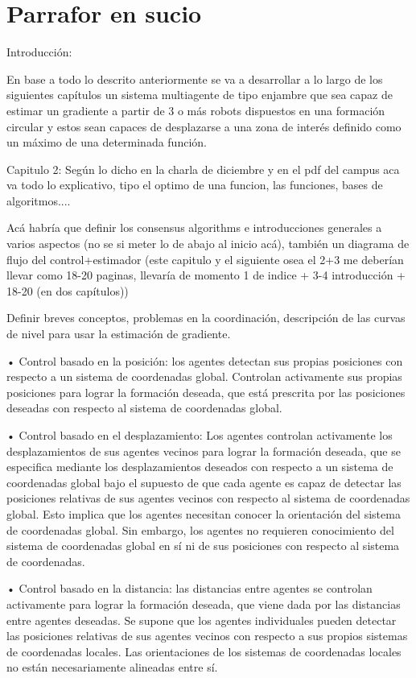 \newpage
\thispagestyle{empty}
\mbox{}

\chapter{Parrafor en sucio}
\label{ch:chapter6}

Introducción:

En base a todo lo descrito anteriormente se va a desarrollar a lo largo de los siguientes capítulos un  sistema multiagente de tipo enjambre que sea capaz de estimar un gradiente a partir de 3 o más robots dispuestos en una formación circular y estos sean capaces de desplazarse a una zona de interés definido como un máximo de una determinada función.


Capitulo 2: Según lo dicho en la charla de diciembre y en el pdf del campus aca va todo lo explicativo, tipo el optimo de una funcion, las funciones, bases de algoritmos....

Acá habría que definir los consensus algorithms e introducciones generales a varios aspectos (no se si meter lo de abajo al inicio acá), también un diagrama de flujo del control+estimador (este capitulo y el siguiente osea el 2+3 me deberían llevar como 18-20 paginas, llevaría de momento 1 de indice + 3-4 introducción + 18-20 (en dos capítulos))


Definir breves conceptos, problemas en la coordinación, descripción de las curvas de nivel para usar la estimación de gradiente.


• Control basado en la posición: los agentes detectan sus propias posiciones con respecto a un sistema de coordenadas global. Controlan activamente sus propias posiciones para lograr la formación deseada, que está prescrita por las posiciones deseadas con respecto al sistema de coordenadas global.

• Control basado en el desplazamiento: Los agentes controlan activamente los desplazamientos de sus agentes vecinos para lograr la formación deseada, que se especifica mediante los desplazamientos deseados con respecto a un sistema de coordenadas global bajo el supuesto de que cada agente es capaz de detectar las posiciones relativas de sus agentes vecinos con respecto al sistema de coordenadas global. Esto implica que los agentes necesitan conocer la orientación del sistema de coordenadas global. Sin embargo, los agentes no requieren conocimiento del sistema de coordenadas global en sí ni de sus posiciones con respecto al sistema de coordenadas.

• Control basado en la distancia: las distancias entre agentes se controlan activamente para lograr la formación deseada, que viene dada por las distancias entre agentes deseadas. Se supone que los agentes individuales pueden detectar las posiciones relativas de sus agentes vecinos con respecto a sus propios sistemas de coordenadas locales. Las orientaciones de los sistemas de coordenadas locales no están necesariamente alineadas entre sí.

